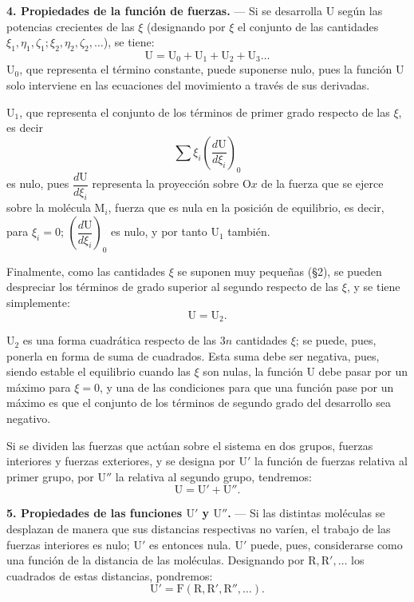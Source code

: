 \noindent\textbf{4. Propiedades de la función de fuerzas.} — Si se desarrolla
$\mathrm{U}$ según las potencias crecientes de las $\xi$ (designando por
$\xi$ el conjunto de las cantidades $\xi_1,\eta_1,\zeta_1;\xi_2,\eta_2,\zeta_2,\ldots$),
se tiene:
\[
\mathrm{U}=\mathrm{U}_0+\mathrm{U}_1+\mathrm{U}_2+\mathrm{U}_3\ldots
\]
$\mathrm{U}_0$, que representa el término constante, puede suponerse nulo,
pues la función $\mathrm{U}$ solo interviene en las ecuaciones del
movimiento a través de sus derivadas.

$\mathrm{U}_1$, que representa el conjunto de los términos de primer grado
respecto de las $\xi$, es decir
\[
\sum \xi_i\left(\frac{d\mathrm{U}}{d\xi_i}\right)_0
\]
es nulo, pues $\dfrac{d\mathrm{U}}{d\xi_i}$ representa la proyección sobre
$\mathrm{O}x$ de la fuerza que se ejerce sobre la molécula $\mathrm{M}_i$,
fuerza que es nula en la posición de equilibrio, es decir, para $\xi_i=0$;
$\left(\dfrac{d\mathrm{U}}{d\xi_i}\right)_0$ es nulo, y por tanto
$\mathrm{U}_1$ también.

Finalmente, como las cantidades $\xi$ se suponen muy pequeñas (§2), se pueden
despreciar los términos de grado superior al segundo respecto de las $\xi$,
y se tiene simplemente:
\begin{equation}
\mathrm{U}=\mathrm{U}_2.
\tag{2}
\end{equation}

$\mathrm{U}_2$ es una forma cuadrática respecto de las $3n$ cantidades
$\xi$; se puede, pues, ponerla en forma de suma de cuadrados. Esta suma debe
ser negativa, pues, siendo estable el equilibrio cuando las $\xi$ son
nulas, la función $\mathrm{U}$ debe pasar por un máximo para $\xi=0$, y una
de las condiciones para que una función pase por un máximo es que el
conjunto de los términos de segundo grado del desarrollo sea negativo.

Si se dividen las fuerzas que actúan sobre el sistema en dos grupos,
fuerzas interiores y fuerzas exteriores, y se designa por $\mathrm{U}'$ la
función de fuerzas relativa al primer grupo, por $\mathrm{U}''$ la relativa
al segundo grupo, tendremos:
\begin{equation}
\mathrm{U}=\mathrm{U}'+\mathrm{U}''.
\tag{3}
\end{equation}

\noindent\textbf{5. Propiedades de las funciones $\mathrm{U}'$ y
$\mathrm{U}''$.} — Si las distintas moléculas se desplazan de manera que
sus distancias respectivas no varíen, el trabajo de las fuerzas interiores
es nulo; $\mathrm{U}'$ es entonces nula. $\mathrm{U}'$ puede, pues,
considerarse como una función de la distancia de las moléculas. Designando
por $\mathrm{R},\mathrm{R}',\ldots$ los cuadrados de estas distancias,
pondremos:
\begin{equation}
\mathrm{U}'=\mathrm{F}(\mathrm{R},\mathrm{R}',\mathrm{R}'',\ldots).
\tag{4}
\end{equation}

